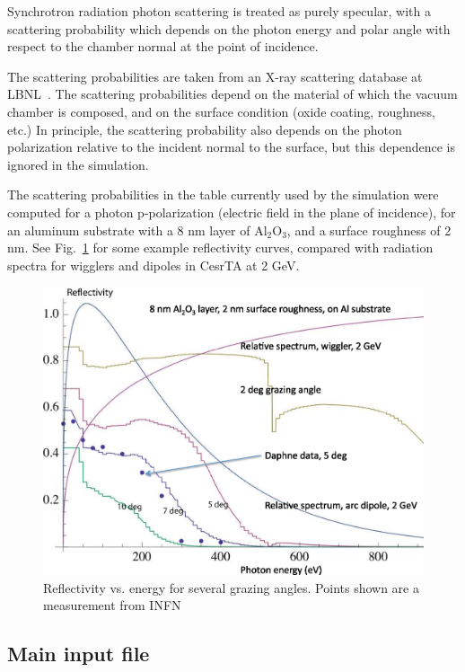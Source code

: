 \documentclass[11pt]{article}
\begin{document}
Synchrotron radiation
photon scattering is treated as purely specular, with a scattering
probability which depends on the photon energy and polar angle with
respect to the chamber normal at the point of incidence.

The scattering probabilities are taken from an X-ray scattering
database at LBNL~\cite{b.henke}. The scattering probabilities depend on
the material of which the vacuum chamber is composed, and on the
surface condition (oxide coating, roughness, etc.) In principle, the
scattering probability also depends on the photon polarization
relative to the incident normal to the surface, but this dependence is
ignored in the simulation.

The scattering probabilities in the table currently used by the
simulation were computed for a photon p-polarization (electric field
in the plane of incidence), for an aluminum substrate with a 8 nm
layer of Al$_2$O$_3$, and a surface roughness of 2 nm. See
Fig.~\ref{f.reflect} for some example reflectivity curves, compared with
radiation spectra for wigglers and dipoles in CesrTA at 2 GeV.

\begin{figure}[tb]
\begin{center}
\includegraphics[width=5in]{reflectivity.eps}
\caption{Reflectivity vs. energy for several grazing angles. 
Points shown are a measurement from INFN~\cite{b.mehne}}
\label{f.reflect}
\end{center}
\end{figure}

\subsection{Main input file} 
\end{document}
